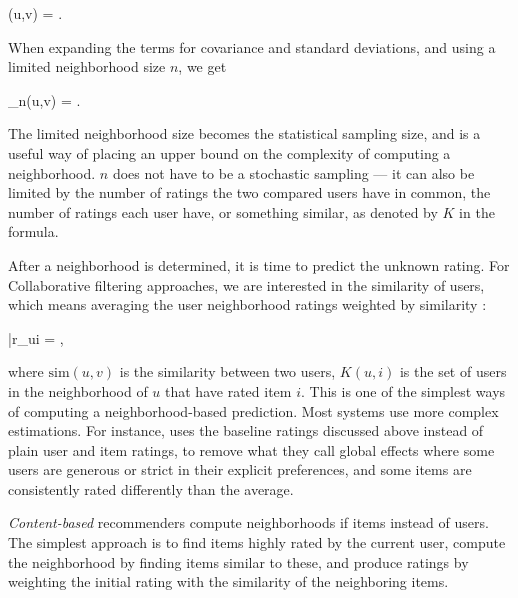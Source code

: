\begin{eqsp}
  (u,v) = .
\end{eqsp}

When expanding the terms for covariance and standard deviations, 
and using a limited neighborhood size $n$, we get

\begin{eqsp}
  _{n}(u,v) = 
    .
\end{eqsp}

The limited neighborhood size becomes the statistical sampling size, and is a useful
way of placing an upper bound on the complexity of computing a neighborhood.
$n$ does not have to be a stochastic sampling --- it can also be limited by the number of ratings 
the two compared users have in common, the number of ratings each user have, or something similar,
as denoted by $K$ in the formula.

After a neighborhood is determined, it is time to predict the unknown rating.
For Collaborative filtering approaches, we are interested in the similarity of users,
which means averaging the user neighborhood ratings weighted by similarity \cite[p16]{Segaran2007}:

\begin{eqsp}
  \bar{r}_{ui} = ,
\end{eqsp}
%
where $\mathrm{sim}(u,v)$ is the similarity between two users, $K(u,i)$ is the set of users in the neighborhood of $u$ that have rated item $i$.
This is one of the simplest ways of computing a neighborhood-based prediction.
Most systems use more complex estimations. For instance, \cite{Koren2008} 
uses the baseline ratings discussed above instead of plain user and item ratings, to
remove what they call global effects where some users are generous or strict in their 
explicit preferences, and some items are consistently rated differently than the average.

\emph{Content-based} recommenders compute neighborhoods if items instead of users.
The simplest approach is to find items highly rated by the current user, compute the neighborhood 
by finding items similar to these, and produce ratings by weighting the initial rating
with the similarity of the neighboring items.

